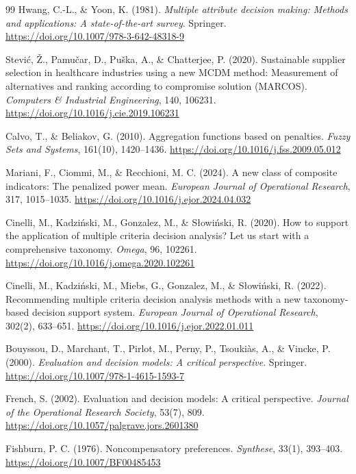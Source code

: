 \documentclass[reqno,11pt]{amsart}
\theoremstyle{definition}
\theoremstyle{plain}
\theoremstyle{remark}
\begin{document}
\begin{thebibliography}{99}
Hwang, C.-L., \& Yoon, K. (1981). \emph{Multiple attribute decision making: Methods and applications: A state-of-the-art survey}. Springer. \url{https://doi.org/10.1007/978-3-642-48318-9}

Stevi\'c, \v{Z}., Pamu\v{c}ar, D., Pu\v{s}ka, A., \& Chatterjee, P. (2020). Sustainable supplier selection in healthcare industries using a new MCDM method: Measurement of alternatives and ranking according to compromise solution (MARCOS). \emph{Computers \& Industrial Engineering}, 140, 106231. \url{https://doi.org/10.1016/j.cie.2019.106231}

Calvo, T., \& Beliakov, G. (2010). Aggregation functions based on penalties. \emph{Fuzzy Sets and Systems}, 161(10), 1420--1436. \url{https://doi.org/10.1016/j.fss.2009.05.012}

Mariani, F., Ciommi, M., \& Recchioni, M. C. (2024). A new class of composite indicators: The penalized power mean. \emph{European Journal of Operational Research}, 317, 1015--1035. \url{https://doi.org/10.1016/j.ejor.2024.04.032}

Cinelli, M., Kadzi\'nski, M., Gonzalez, M., \& S\l{}owi\'nski, R. (2020). How to support the application of multiple criteria decision analysis? Let us start with a comprehensive taxonomy. \emph{Omega}, 96, 102261. \url{https://doi.org/10.1016/j.omega.2020.102261}

Cinelli, M., Kadzi\'nski, M., Miebs, G., Gonzalez, M., \& S\l{}owi\'nski, R. (2022). Recommending multiple criteria decision analysis methods with a new taxonomy-based decision support system. \emph{European Journal of Operational Research}, 302(2), 633--651. \url{https://doi.org/10.1016/j.ejor.2022.01.011}

Bouyssou, D., Marchant, T., Pirlot, M., Perny, P., Tsouki\`as, A., \& Vincke, P. (2000). \emph{Evaluation and decision models: A critical perspective}. Springer. \url{https://doi.org/10.1007/978-1-4615-1593-7}

French, S. (2002). Evaluation and decision models: A critical perspective. \emph{Journal of the Operational Research Society}, 53(7), 809. \url{https://doi.org/10.1057/palgrave.jors.2601380}

Fishburn, P. C. (1976). Noncompensatory preferences. \emph{Synthese}, 33(1), 393--403. \url{https://doi.org/10.1007/BF00485453}


\end{thebibliography}
\end{document}
